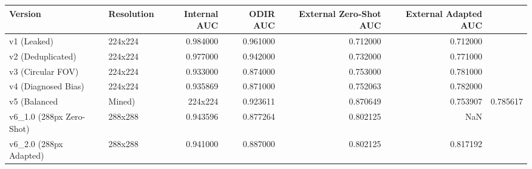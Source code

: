 \begin{tabular}{llrrrr}
\toprule
Version & Resolution & Internal AUC & ODIR AUC & External Zero-Shot AUC & External Adapted AUC \\
\midrule
v1 (Leaked) & 224x224 & 0.984000 & 0.961000 & 0.712000 & 0.712000 \\
v2 (Deduplicated) & 224x224 & 0.977000 & 0.942000 & 0.732000 & 0.771000 \\
v3 (Circular FOV) & 224x224 & 0.933000 & 0.874000 & 0.753000 & 0.781000 \\
v4 (Diagnosed Bias) & 224x224 & 0.935869 & 0.871000 & 0.752063 & 0.782000 \\
v5 (Balanced & Mined) & 224x224 & 0.923611 & 0.870649 & 0.753907 & 0.785617 \\
v6_1.0 (288px Zero-Shot) & 288x288 & 0.943596 & 0.877264 & 0.802125 & NaN \\
v6_2.0 (288px Adapted) & 288x288 & 0.941000 & 0.887000 & 0.802125 & 0.817192 \\
\bottomrule
\end{tabular}
